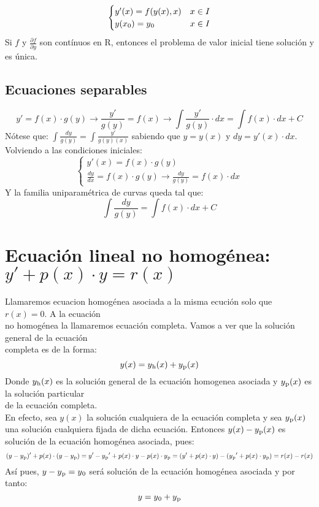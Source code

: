 \documentclass{article}
\begin{document}
\begin{equation}
    \begin{cases}
        y'(x)=f(y(x),x) & x \in I \\
        y(x\textsubscript{0})=y\textsubscript{0} & x \in I
    \end{cases} 
\end{equation}
Si $f$ y $\frac{\partial f}{\partial y}$ son contínuos en R, entonces el problema de valor inicial tiene solución y es única.

\subsection{Ecuaciones separables}
\[y'=f(x) \cdot g(y) \rightarrow \frac{y'}{g(y)}=f(x) \rightarrow \int\frac{y'}{g(y)}\cdot dx = \int f(x) \cdot dx + C\]
Nótese que: $\int\frac{dy}{g(y)}=\int\frac{y'}{g(y)(x)}$ sabiendo que $y = y(x)$ y $dy = y'(x)\cdot dx$.\\
Volviendo a las condiciones iniciales:
\begin{equation}
    \begin{cases}
        y'(x)=f(x)\cdot g(y) \\
        \frac{dy}{dx}=f(x)\cdot g(y) \rightarrow \frac{dy}{g(y)}=f(x)\cdot dx
    \end{cases} 
\end{equation}
Y la familia uniparamétrica de curvas queda tal que:
\[\int\frac{dy}{g(y)}=\int f(x)\cdot dx + C\]

\section{Ecuación lineal no homogénea: $y'+p(x)\cdot y=r(x)$}
Llamaremos ecuacion homogénea asociada a la misma ecución solo que $r(x)=0$. A la ecuación\\
no homogénea la llamaremos ecuación completa. Vamos a ver que la solución general de la ecuación\\
completa es de la forma:
\[y(x) = y\textsubscript{h}(x)+y\textsubscript{p}(x)\]
Donde $y\textsubscript{h}(x)$ es la solución general de la ecuación homogenea asociada y $y\textsubscript{p}(x)$ es la solución particular \\
de la ecuación completa.\\
En efecto, sea $y(x)$ la solución cualquiera de la ecuación completa y sea $y\textsubscript{p}(x)$ una solución cualquiera fijada de dicha ecuación.
Entonces $y(x)-y\textsubscript{p}(x)$ es solución de la ecuación homogénea asociada, pues:
\[(y-y\textsubscript{p})'+p(x)\cdot (y-y\textsubscript{p})=y'-y\textsubscript{p}'+p(x)\cdot y-p(x)\cdot y\textsubscript{p}=(y'+p(x)\cdot y)-(y\textsubscript{p}'+p(x)\cdot y\textsubscript{p})=r(x)-r(x)\]
Así pues, $y-y\textsubscript{p}=y\textsubscript{0}$ será solución de la ecuación homogénea asociada y por tanto:
\[y=y\textsubscript{0}+y\textsubscript{p}\]
\end{document}
